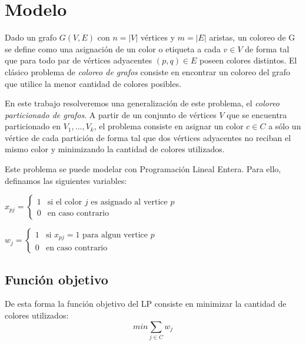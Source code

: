 \section{Modelo}

Dado un grafo $G(V,E)$ con $n = |V|$ vértices y $m = |E|$ aristas, un coloreo de G se define como una asignación de un color o etiqueta a cada $v \in V$ de forma tal que para todo  par de vértices adyacentes $(p,q) \in E$ poseen colores distintos. El clásico problema de \textit{coloreo de grafos} consiste en encontrar un coloreo del grafo que utilice la menor cantidad de colores posibles.

En este trabajo resolveremos una generalización de este problema, el \textit{coloreo particionado de grafos}. A partir de un conjunto de vértices $V$ que se encuentra particionado en $V_1,...,V_k$, el problema consiste en asignar un color $c \in C$ a sólo un vértice de cada partición de forma tal que dos vértices adyacentes no reciban el mismo color y minimizando la cantidad de colores utilizados.

Este problema se puede modelar con Programación Lineal Entera. Para ello, definamos las siguientes variables:

\hspace{1px}

\begin{center}
$x_{pj} = \begin{cases}
  1 & \text{si el color $j$ es asignado al vertice $p$} \\
  0 & \text{en caso contrario}
\end{cases}$

\hspace{1px}

$w_j = \begin{cases}
  1 & \text{si $x_{pj} = 1$ para algun vertice $p$} \\
  0 & \text{en caso contrario}
\end{cases}$
\end{center}

\subsection{Función objetivo}

De esta forma la función objetivo del LP consiste en minimizar la cantidad de colores utilizados:
\begin{equation}
min \sum_{j \in C} w_j
\end{equation}

